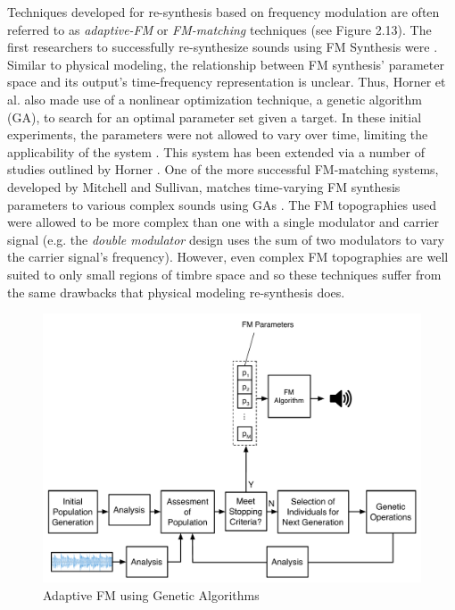 \documentclass[a4paper,12pt]{report} 	%
\numberwithin{figure}{chapter}
\numberwithin{table}{chapter}
\numberwithin{equation}{chapter}
\begin{document}
\begin{flushleft}
Techniques developed for re-synthesis based on frequency modulation are often referred to as \emph{adaptive-FM} or \emph{FM-matching} techniques (see Figure 2.13). The first researchers to successfully re-synthesize sounds using FM Synthesis were \cite{Horner:1993il}. Similar to physical modeling, the relationship between FM synthesis' parameter space and its output's time-frequency representation is unclear. Thus, Horner et al. also made use of a nonlinear optimization technique, a genetic algorithm (GA), to search for an optimal parameter set given a target. In these initial experiments, the parameters were not allowed to vary over time, limiting the applicability of the system \cite[p. 22]{Horner:1993il}. This system has been extended via a number of studies outlined by Horner \cite{Horner:2003ov}. One of the more successful FM-matching systems, developed by Mitchell and Sullivan, matches time-varying FM synthesis parameters to various complex sounds using GAs \cite{Mitchell:2005ez}. The FM topographies used were allowed to be more complex than one with a single modulator and carrier signal (e.g. the \emph{double modulator} design uses the sum of two modulators to vary the carrier signal's frequency). However, even complex FM topographies are well suited to only small regions of timbre space and so these techniques suffer from the same drawbacks that physical modeling re-synthesis does.
\\
\begin{figure}[h!]
\begin{center}
\includegraphics[scale=0.50]{AdaptiveFM}
\caption[Adaptive FM]{Adaptive FM using Genetic Algorithms}
\end{center}
\end{figure}


\end{flushleft}
\end{document}
